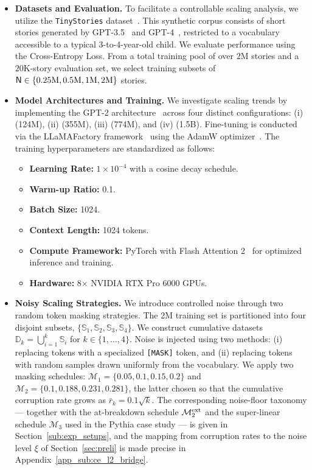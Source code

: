 \documentclass[11pt]{article}
\theoremstyle{plain}
\begin{document}
\begin{itemize}
    \item \textbf{Datasets and Evaluation.} To facilitate a controllable scaling analysis, we utilize the \texttt{TinyStories} dataset~\citep{el23}. This synthetic corpus consists of short stories generated by GPT-3.5~\citep{rwc+19} and GPT-4~\citep{bce+23}, restricted to a vocabulary accessible to a typical 3-to-4-year-old child. We evaluate performance using the Cross-Entropy Loss. From a total training pool of over $2$M stories and a $20$K-story evaluation set, we select training subsets of ${\sf N} \in \{0.25\text{M}, 0.5\text{M}, 1\text{M}, 2\text{M}\}$ stories.

    \item \textbf{Model Architectures and Training.} We investigate scaling trends by implementing the GPT-2 architecture~\citep{bmr+20} across four distinct configurations: (i)  (124M), (ii)  (355M), (iii)  (774M), and (iv)  (1.5B). Fine-tuning is conducted via the LLaMAFactory framework~\citep{zrj+24} using the AdamW optimizer~\citep{kb14}. The training hyperparameters are standardized as follows:
    \begin{itemize}
        \item \textbf{Learning Rate:} $1 \times 10^{-4}$ with a cosine decay schedule.
        \item \textbf{Warm-up Ratio:} 0.1.
        \item \textbf{Batch Size:} 1024.
        \item \textbf{Context Length:} 1024 tokens.
        \item \textbf{Compute Framework:} PyTorch with Flash Attention 2~\citep{dfe+22, dao23} for optimized inference and training.
        \item \textbf{Hardware:} 8$\times$ NVIDIA RTX Pro 6000 GPUs.
    \end{itemize}

    \item \textbf{Noisy Scaling Strategies.} We introduce controlled noise through two random token masking strategies. The 2M training set is partitioned into four disjoint subsets, $\{\mathbb{S}_1, \mathbb{S}_2, \mathbb{S}_3, \mathbb{S}_4\}$. We construct cumulative datasets $\mathbb{D}_k = \bigcup_{i=1}^k \mathbb{S}_i$ for $k \in \{1, \dots, 4\}$. Noise is injected using two methods: (i) replacing tokens with a specialized \texttt{[MASK]} token, and (ii) replacing tokens with random samples drawn uniformly from the vocabulary. We apply two masking schedules: $\mathcal{M}_1 = \{0.05, 0.1, 0.15, 0.2\}$ and $\mathcal{M}_2 = \{0.1, 0.188, 0.231, 0.281\}$, the latter chosen so that the cumulative corruption rate grows as $\bar r_k = 0.1\sqrt{k}$. The corresponding noise-floor taxonomy --- together with the at-breakdown schedule $\mathcal{M}_2^{\rm ext}$ and the super-linear schedule $\mathcal{M}_3$ used in the Pythia case study --- is given in Section~\ref{sub:exp_setups}, and the mapping from corruption rates to the noise level $\xi$ of Section~\ref{sec:preli} is made precise in Appendix~\ref{app_sub:ce_l2_bridge}.
\end{itemize}
\end{document}
